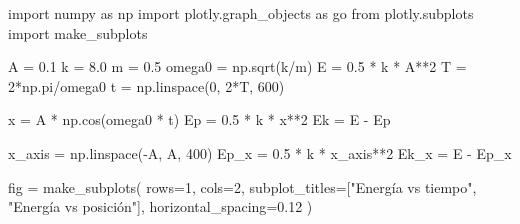 \documentclass[
  letterpaper,
  DIV=11,
  numbers=noendperiod]{scrreprt}
\newenvironment{Shaded}{\begin{snugshade}}{\end{snugshade}}
\newcommand{\DecValTok}[1]{\textcolor[rgb]{0.68,0.00,0.00}{#1}}
\newcommand{\FloatTok}[1]{\textcolor[rgb]{0.68,0.00,0.00}{#1}}
\newcommand{\ImportTok}[1]{\textcolor[rgb]{0.00,0.46,0.62}{#1}}
\newcommand{\NormalTok}[1]{\textcolor[rgb]{0.00,0.23,0.31}{#1}}
\newcommand{\OperatorTok}[1]{\textcolor[rgb]{0.37,0.37,0.37}{#1}}
\newcommand{\StringTok}[1]{\textcolor[rgb]{0.13,0.47,0.30}{#1}}
\begin{document}
\begin{Shaded}
\begin{Highlighting}[]
\ImportTok{import}\NormalTok{ numpy }\ImportTok{as}\NormalTok{ np}
\ImportTok{import}\NormalTok{ plotly.graph\_objects }\ImportTok{as}\NormalTok{ go}
\ImportTok{from}\NormalTok{ plotly.subplots }\ImportTok{import}\NormalTok{ make\_subplots}

\NormalTok{A      }\OperatorTok{=} \FloatTok{0.1}
\NormalTok{k      }\OperatorTok{=} \FloatTok{8.0}
\NormalTok{m      }\OperatorTok{=} \FloatTok{0.5}
\NormalTok{omega0 }\OperatorTok{=}\NormalTok{ np.sqrt(k}\OperatorTok{/}\NormalTok{m)}
\NormalTok{E      }\OperatorTok{=} \FloatTok{0.5} \OperatorTok{*}\NormalTok{ k }\OperatorTok{*}\NormalTok{ A}\OperatorTok{**}\DecValTok{2}
\NormalTok{T      }\OperatorTok{=} \DecValTok{2}\OperatorTok{*}\NormalTok{np.pi}\OperatorTok{/}\NormalTok{omega0}
\NormalTok{t      }\OperatorTok{=}\NormalTok{ np.linspace(}\DecValTok{0}\NormalTok{, }\DecValTok{2}\OperatorTok{*}\NormalTok{T, }\DecValTok{600}\NormalTok{)}

\NormalTok{x  }\OperatorTok{=}\NormalTok{ A }\OperatorTok{*}\NormalTok{ np.cos(omega0 }\OperatorTok{*}\NormalTok{ t)}
\NormalTok{Ep }\OperatorTok{=} \FloatTok{0.5} \OperatorTok{*}\NormalTok{ k }\OperatorTok{*}\NormalTok{ x}\OperatorTok{**}\DecValTok{2}
\NormalTok{Ek }\OperatorTok{=}\NormalTok{ E }\OperatorTok{{-}}\NormalTok{ Ep}

\NormalTok{x\_axis }\OperatorTok{=}\NormalTok{ np.linspace(}\OperatorTok{{-}}\NormalTok{A, A, }\DecValTok{400}\NormalTok{)}
\NormalTok{Ep\_x   }\OperatorTok{=} \FloatTok{0.5} \OperatorTok{*}\NormalTok{ k }\OperatorTok{*}\NormalTok{ x\_axis}\OperatorTok{**}\DecValTok{2}
\NormalTok{Ek\_x   }\OperatorTok{=}\NormalTok{ E }\OperatorTok{{-}}\NormalTok{ Ep\_x}

\NormalTok{fig }\OperatorTok{=}\NormalTok{ make\_subplots(}
\NormalTok{    rows}\OperatorTok{=}\DecValTok{1}\NormalTok{, cols}\OperatorTok{=}\DecValTok{2}\NormalTok{,}
\NormalTok{    subplot\_titles}\OperatorTok{=}\NormalTok{[}\StringTok{"Energía vs tiempo"}\NormalTok{, }\StringTok{"Energía vs posición"}\NormalTok{],}
\NormalTok{    horizontal\_spacing}\OperatorTok{=}\FloatTok{0.12}
\NormalTok{)}


\end{Highlighting}
\end{Shaded}
\end{document}
